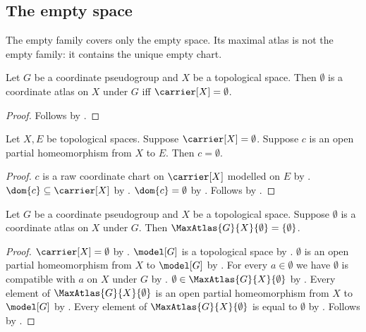 \subsection{The empty space}

The empty family covers only the empty space. Its maximal atlas is not the
empty family: it contains the unique empty chart.

\begin{theorem}\label{empty_coordinate_atlas_iff}
    Let $G$ be a coordinate pseudogroup and $X$ be a topological space.
    Then $\emptyset$ is a coordinate atlas on $X$ under $G$ iff
        $\carrier[X]=\emptyset$.
\end{theorem}
\begin{proof}
    Follows by .
\end{proof}

\begin{theorem}\label{empty_source_chart}
    Let $X,E$ be topological spaces.
    Suppose $\carrier[X]=\emptyset$.
    Suppose $c$ is an open partial homeomorphism from $X$ to $E$.
    Then $c=\emptyset$.
\end{theorem}
\begin{proof}
    $c$ is a raw coordinate chart on $\carrier[X]$ modelled on $E$ by
        .
    $\dom{c}\subseteq\carrier[X]$ by .
    $\dom{c}=\emptyset$ by .
    Follows by .
\end{proof}

\begin{theorem}\label{empty_max_atlas}
    Let $G$ be a coordinate pseudogroup and $X$ be a topological space.
    Suppose $\emptyset$ is a coordinate atlas on $X$ under $G$.
    Then $\MaxAtlas{G}{X}{\emptyset}=\{\emptyset\}$.
\end{theorem}
\begin{proof}
    $\carrier[X]=\emptyset$ by .
    $\model[G]$ is a topological space by .
    $\emptyset$ is an open partial homeomorphism from $X$ to $\model[G]$ by
        .
    For every $a\in\emptyset$ we have $\emptyset$ is compatible with $a$ on $X$
        under $G$ by \auto.
    $\emptyset\in\MaxAtlas{G}{X}{\emptyset}$ by .
    Every element of $\MaxAtlas{G}{X}{\emptyset}$ is an open partial homeomorphism
        from $X$ to $\model[G]$ by .
    Every element of $\MaxAtlas{G}{X}{\emptyset}$ is equal to $\emptyset$ by
        .
    Follows by .
\end{proof}
